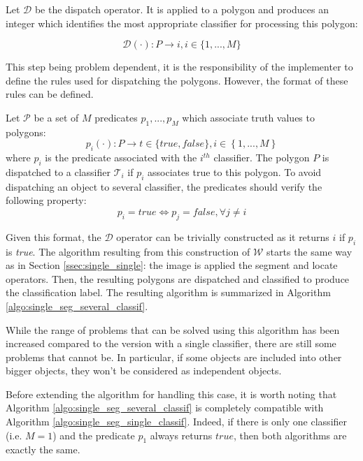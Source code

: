 \begin{definition}\label{def:dispatch_op} 
	Let $\mathcal{D}$ be the dispatch operator. It is applied to a polygon and produces an integer which identifies the most appropriate classifier for processing this polygon: 

	\begin{equation}
		\mathcal{D}(\cdot) : P \rightarrow i, i \in \{1,...,M\}
	\end{equation}
\end{definition}

This step being problem dependent, it is the responsibility of the implementer to define the rules used for dispatching the polygons. However, the format of these rules can be defined.

\begin{definition} 
	Let $\mathcal{P}$ be a set of $M$ predicates $p_1, ..., p_M$ which associate truth values to polygons:
	\begin{equation}
		p_i(\cdot) : P \rightarrow t \in \{true, false\}, i \in \left\{1,...,M\right\} 
	\end{equation}
	where $p_i$ is the predicate associated with the $i^{th}$ classifier. The polygon $P$ is dispatched to a classifier $\mathcal{T}_i$ if $p_i$ associates true to this polygon. To avoid dispatching an object to several classifier, the predicates should verify the following property:
	\begin{equation}
		p_i = true \Leftrightarrow p_j = false, \forall j \neq i
	\end{equation} 
\end{definition}

Given this format, the $\mathcal{D}$ operator can be trivially constructed as it returns $i$ if $p_i$ is \textit{true}. The algorithm resulting from this construction of $\mathcal{W}$ starts the same way as in Section \ref{ssec:single_single}: the image is applied the segment and locate operators. Then, the resulting polygons are dispatched and classified to produce the classification label. The resulting algorithm is summarized in Algorithm \ref{algo:single_seg_several_classif}. 

While the range of problems that can be solved using this algorithm has been increased compared to the version with a single classifier, there are still some problems that cannot be. In particular, if some objects are included into other bigger objects, they won't be considered as independent objects. 

Before extending the algorithm for handling this case, it is worth noting that Algorithm \ref{algo:single_seg_several_classif} is completely compatible with Algorithm \ref{algo:single_seg_single_classif}. Indeed, if there is only one classifier (i.e. $M = 1$) and the predicate $p_1$ always returns $true$, then both algorithms are exactly the same. 

